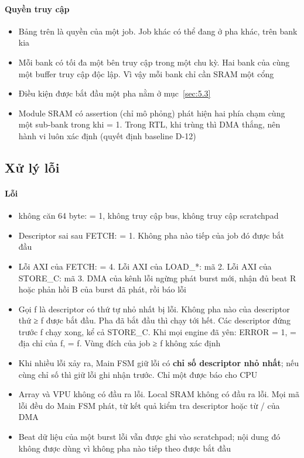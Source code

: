 \paragraph{Quyền truy cập}\label{par:4-4}
\begin{itemize}
\item Bảng trên là quyền của một job. Job khác có thể đang ở pha khác, trên bank kia
\item Mỗi bank có tối đa một bên truy cập trong một chu kỳ. Hai bank của cùng một buffer truy cập độc lập. Vì vậy mỗi bank chỉ cần SRAM một cổng
\item Điều kiện được bắt đầu một pha nằm ở mục~\ref{sec:5.3}
\item Module SRAM có assertion (chỉ mô phỏng) phát hiện hai phía chạm cùng một sub-bank trong khi  = 1. Trong RTL, khi trùng thì DMA thắng, nên hành vi luôn xác định (quyết định baseline D-12)
\end{itemize}

\subsection{Xử lý lỗi}\label{sec:4.4}

\paragraph{Lỗi}\label{par:4-5}
\begin{itemize}
\item {} không căn 64 byte:  = 1, không truy cập bus, không truy cập scratchpad
\item Descriptor sai sau FETCH:  = 1. Không pha nào tiếp của job đó được bắt đầu
\item Lỗi AXI của FETCH:  = 4. Lỗi AXI của LOAD\_*: mã 2. Lỗi AXI của STORE\_C: mã 3. DMA của kênh lỗi ngừng phát burst mới, nhận đủ beat R hoặc phản hồi B của burst đã phát, rồi báo lỗi
\item Gọi f là descriptor có thứ tự nhỏ nhất bị lỗi. Không pha nào của descriptor thứ ≥ f được bắt đầu. Pha đã bắt đầu thì chạy tới hết. Các descriptor đứng trước f chạy xong, kể cả STORE\_C. Khi mọi engine đã yên: ERROR = 1,  = địa chỉ của f,  = f. Vùng đích của job ≥ f không xác định
\item Khi nhiều lỗi xảy ra, Main FSM giữ lỗi có \textbf{chỉ số descriptor nhỏ nhất}; nếu cùng chỉ số thì giữ lỗi ghi nhận trước. Chỉ một  được báo cho CPU
\item Array và VPU không có đầu ra lỗi. Local SRAM không có đầu ra lỗi. Mọi mã lỗi đều do Main FSM phát, từ kết quả kiểm tra descriptor hoặc từ  /  của DMA
\item Beat dữ liệu của một burst lỗi vẫn được ghi vào scratchpad; nội dung đó không được dùng vì không pha nào tiếp theo được bắt đầu
\end{itemize}

